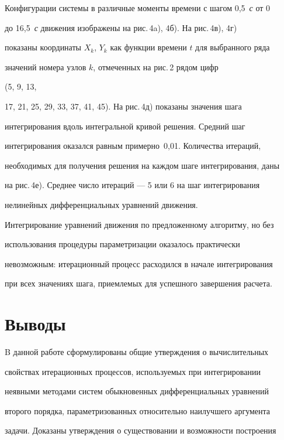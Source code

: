Конфигурации системы в различные моменты времени с шагом 0,5~{\it с} от 0 


до 16,5~{\it с} движения изображены на рис.\,4a), 4б). На рис.\,4в), 4г) 


показаны координаты $X_k$, $Y_k$ как функции времени $t$ для выбранного ряда 


значений номера узлов $k$, отмеченных на рис.\,2 рядом цифр\linebreak


(5, 9, 13, 


17, 21, 25, 29, 33, 37, 41, 45). На рис.\,4д) показаны значения шага 


интегрирования вдоль интегральной кривой решения. Средний шаг 


интегрирования оказался равным примерно~0,01. Количества итераций, 


необходимых для получения решения на каждом шаге интегрирования, даны 


на рис.\,4е). Среднее число итераций --- 5 или 6 на шаг интегрирования 


нелинейных дифференциальных уравнений движения. 


 


Интегрирование уравнений движения по предложенному алгоритму, но без 


использования процедуры параметризации оказалось практически 


невозможным: итерационный процесс расходился в начале интегрирования 


при всех значениях шага, приемлемых для успешного завершения расчета. 


 





\section{Выводы}


 


B данной работе сформулированы общие утверждения о вычислительных 


свойствах итерационных процессов, используемых при интегрировании 


неявными методами систем обыкновенных дифференциальных уравнений 


второго порядка, параметризованных относительно наилучшего аргумента 


задачи. Доказаны утверждения о существовании и возможности построения 



